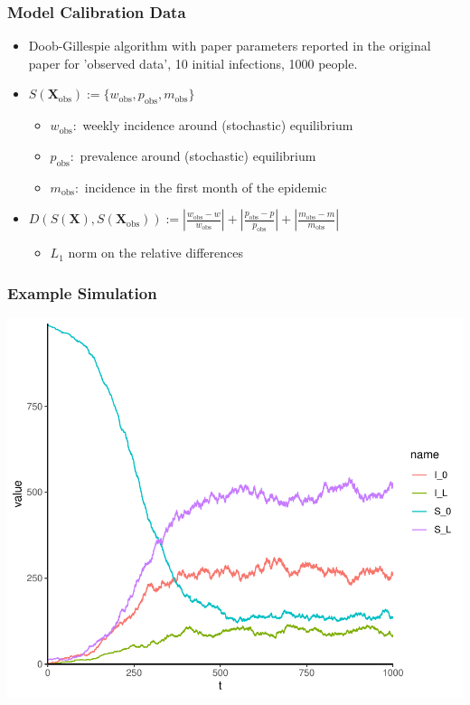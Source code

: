 \documentclass{beamer}
\begin{document}
\begin{frame}
    \frametitle{Model Calibration Data}\begin{itemize}
        \item Doob-Gillespie algorithm with paper parameters reported in the original paper for 'observed data', 10 initial infections, 1000 people.
        \item <2->$S(\mathbf{X}_\text{obs}) := \{w_\text{obs}, p_\text{obs}, m_\text{obs}\}$ \begin{itemize}
                  \item $w_\text{obs}:$ weekly incidence around (stochastic) equilibrium
                  \item $p_\text{obs}:$ prevalence around (stochastic) equilibrium
                  \item $m_\text{obs}:$ incidence in the first month of the epidemic
              \end{itemize}
        \item <3-> $D(S(\mathbf{X}), S(\mathbf{X}_\text{obs})) := \left|\frac{w_\text{obs} - w}{w_\text{obs}}\right| + \left|\frac{p_\text{obs} - p}{p_\text{obs}}\right| + \left|\frac{m_\text{obs} - m}{m_\text{obs}}\right|$ \begin{itemize}
                  \item $L_1$ norm on the relative differences
              \end{itemize}
    \end{itemize}
\end{frame}

\begin{frame}
    \frametitle{Example Simulation}
    \includegraphics[width=\textwidth]{doob_champagne.pdf}
\end{frame}
\end{document}
